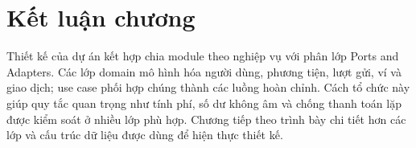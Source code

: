 \section{Kết luận chương}

Thiết kế của dự án kết hợp chia module theo nghiệp vụ với phân lớp Ports and Adapters. Các lớp domain mô hình hóa người dùng, phương tiện, lượt gửi, ví và giao dịch; use case phối hợp chúng thành các luồng hoàn chỉnh. Cách tổ chức này giúp quy tắc quan trọng như tính phí, số dư không âm và chống thanh toán lặp được kiểm soát ở nhiều lớp phù hợp. Chương tiếp theo trình bày chi tiết hơn các lớp và cấu trúc dữ liệu được dùng để hiện thực thiết kế.
